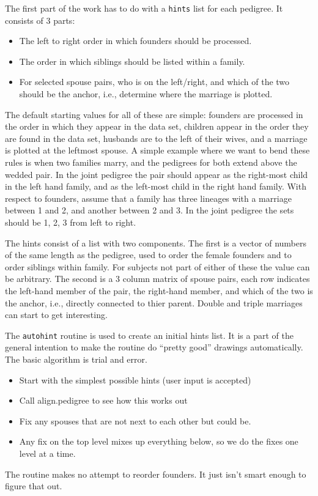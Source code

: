 \documentclass{article}
\begin{document}
\begin{enumerate}
The first part of the work has to do with a {\tt{}hints} list for each
pedigree.  It consists of 3 parts:
\begin{itemize}
  \item The left to right order in which founders should be processed.
  \item The order in which siblings should be listed within a family.
  \item For selected spouse pairs, who is on the left/right, and which of the
    two should be the anchor, i.e., determine where the marriage is plotted.
    \end{itemize}
The default starting values for all of these are simple: founders are 
processed in the order in which they appear in the data set, 
children appear in the order they are found in the data set,
husbands are to the left of their wives, and a marriage is plotted
at the leftmost spouse.
A simple example where we want to bend these rules is when two families
marry, and the pedigrees for both extend above the wedded pair.  
In the joint pedigree the
pair should appear as the right-most child in the left hand family, and
as the left-most child in the right hand family.
With respect to founders, assume that a family has three lineages with
a marriage between 1 and 2, and another between 2 and 3.  In the joint
pedigree the sets should be 1, 2, 3 from left to right.  

The hints consist of a list with two components.
The first is a vector of numbers of the same length as the pedigree,
used to order the female founders and to order siblings within
family.  For subjects not part of either of these the value can be 
arbitrary.  
The second is a 3 column matrix of spouse pairs, each row indicates the
left-hand member of the pair, the right-hand member, and which of the two
is the anchor, i.e., directly connected to thier parent.
Double and triple marriages can start to get interesting.


The {\tt{}autohint} routine is used to create an initial hints list.
It is a part of the general intention to make the routine do
``pretty good'' drawings automatically.                 
The basic algorithm is trial and error. 
\begin{itemize}
  \item Start with the simplest possible hints (user input is accepted)
  \item Call align.pedigree to see how this works out
  \item Fix any spouses that are not next to each other but could be.
  \item Any fix on the top level mixes up everything below, so we do the
    fixes one level at a time.
\end{itemize}
The routine makes no attempt to reorder founders.  It just isn't smart enough%
to figure that out.


\end{enumerate}
\end{document}
